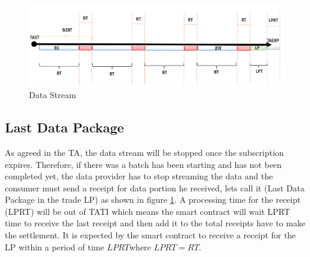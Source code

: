\documentclass[letterpaper, 10 pt, conference]{ieeeconf}  %
\begin{document}







\begin{figure}
  \caption{Data Stream}
  \label{Stream}
  \includegraphics[scale=0.25]{Dis}
  \centering
\end{figure}

\subsection{Last Data Package}
As agreed in the TA, the data stream will be stopped once the subscription expires. Therefore, if there was a batch has been starting and has not been completed yet, the data provider has to stop streaming the data and the consumer must send a receipt for data portion he received, lets call it (Last Data Package in the trade LP) as shown in figure \ref{Stream}. A processing time for the receipt (LPRT) will be out of TATI which means the smart contract will wait LPRT time to receive the last receipt and then  add it to the total receipts have to make the settlement. It is expected by the smart contract to receive a receipt for the LP within a period of time $LPRT $where $LPRT = RT$.
\end{document}
